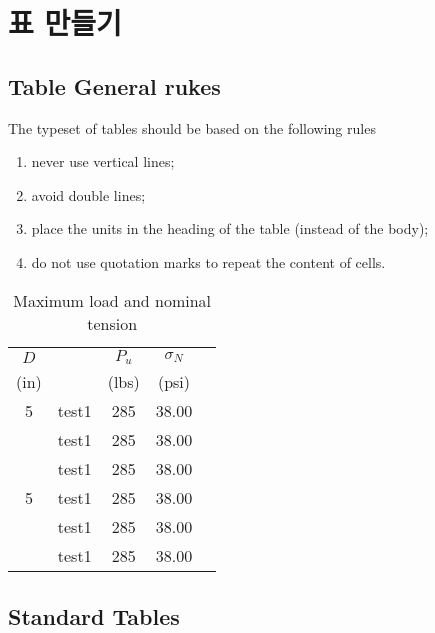 \newpage
\chapter{표 만들기}
		

\clearpage
\section{Table General rukes}
\null

The typeset of tables should be based on the following rules
\begin{enumerate}
	\item never use vertical lines;
	\item avoid double lines;
	\item place the units in the heading of the table (instead of the body);
	\item do not use quotation marks to repeat the content of cells.
\end{enumerate}



	\begin{table}[hbp]
	\caption{Maximum load and nominal tension}
	\centering
	\begin{tabular}{c l c c c}
	\toprule
	$D$  	&& $P_u$ 	& $\sigma_N$ \\
	(in)		&&(lbs)	& (psi) \\
	\toprule
	5   	& test1   & 285  & 38.00 \\
		& test1   & 285  & 38.00 \\
        	& test1   & 285  & 38.00 \\
	\midrule
	5   	& test1   & 285  & 38.00 \\
		& test1   & 285  & 38.00 \\
		& test1   & 285  & 38.00 \\
	\bottomrule
	\end{tabular}%
	\label{aggiungi}%
	\end{table}%
	
	
	
\clearpage
\section{Standard Tables}
\null
	
